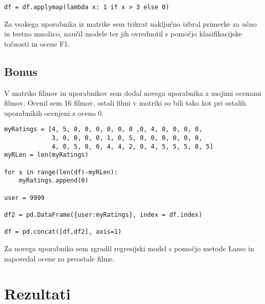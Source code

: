 \documentclass[a4paper,11pt]{article}
\begin{document}
\begin{lstlisting}
df = df.applymap(lambda x: 1 if x > 3 else 0)
\end{lstlisting}

Za vsakega uporabnika iz matrike sem trikrat naključno izbral primerke za učno in testno množico, naučil modele ter jih ovrednotil s pomočjo klasifikacijske točnosti in ocene F1.

\subsection{Bonus}
V matriko filmov in uporabnikov sem dodal novega uporabnika z mojimi ocenami filmov. Ocenil sem 16 filmov, ostali filmi v matriki so bili tako kot pri ostalih uporabnikih ocenjeni z oceno 0.

\begin{lstlisting}
myRatings = [4, 5, 0, 0, 0, 0, 0, 0 ,0, 4, 0, 0, 0, 0,
             3, 0, 0, 0, 0, 1, 0, 5, 0, 0, 0, 0, 0, 0,
             4, 0, 5, 0, 0, 4, 4, 2, 0, 4, 5, 5, 5, 0, 5]
myRLen = len(myRatings)

for x in range(len(df)-myRLen):
    myRatings.append(0)

user = 9999

df2 = pd.DataFrame({user:myRatings}, index = df.index)

df = pd.concat([df,df2], axis=1)
\end{lstlisting}

Za novega uporabnika sem zgradil regresijski model s pomočjo metode Lasso in napovedal ocene za preostale filme.

\section{Rezultati}



\end{document}
